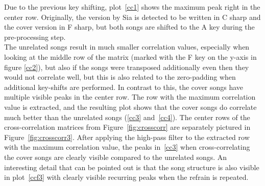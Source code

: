 \noindent Due to the previous key shifting, plot~\ref{cc1} shows the maximum peak right in the center row. Originally, the version by Sia is detected to be written in C sharp and the cover version in F sharp, but both songs are shifted to the A key during the pre-processing step.\\
\noindent The unrelated songs result in much smaller correlation values, especially when looking at the middle row of the matrix (marked with the F key on the y-axis in figure \ref{cc2}), but also if the songs were transposed additionally even then they would not correlate well, but this is also related to the zero-padding when additional key-shifts are performed. 
In contrast to this, the cover songs have multiple visible peaks in the center row. 
\noindent The row with the maximum correlation value is extracted, and the resulting plot shows that the cover songs do correlate much better than the unrelated songs (\ref{cc3} and~\ref{cc4}).
The center rows of the cross-correlation matrices from Figure~\ref{fig:crosscorr} are separately pictured in Figure~\ref{fig:crosscorr3}. After applying the high-pass filter to the extracted row with the maximum correlation value, the peaks in~\ref{cc3} when cross-correlating the cover songs are clearly visible compared to the unrelated songs. An interesting detail that can be pointed out is that the song structure is also visible in plot~\ref{ccf3} with clearly visible recurring peaks when the refrain is repeated.

